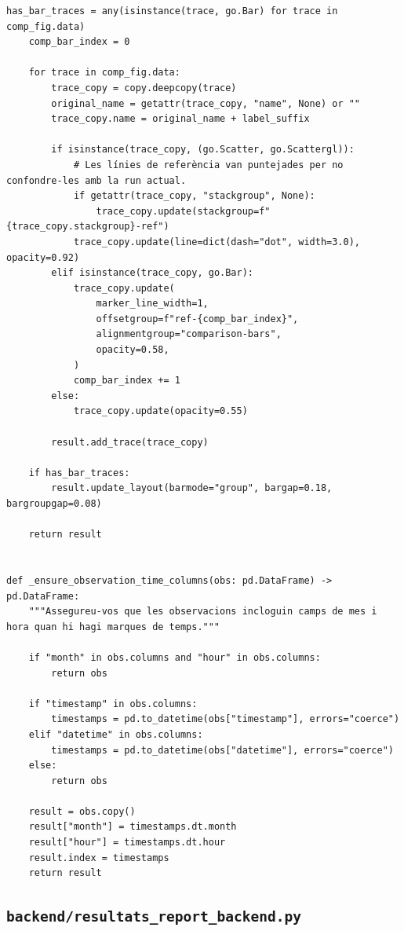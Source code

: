 \documentclass[10pt,a4paper]{article}
\begin{document}
\begin{lstlisting}[style=studioPython,caption={backend/resultats\_backend.py},label={lst:backend-resultats-backend-py}]
    has_bar_traces = any(isinstance(trace, go.Bar) for trace in comp_fig.data)
    comp_bar_index = 0

    for trace in comp_fig.data:
        trace_copy = copy.deepcopy(trace)
        original_name = getattr(trace_copy, "name", None) or ""
        trace_copy.name = original_name + label_suffix

        if isinstance(trace_copy, (go.Scatter, go.Scattergl)):
            # Les línies de referència van puntejades per no confondre-les amb la run actual.
            if getattr(trace_copy, "stackgroup", None):
                trace_copy.update(stackgroup=f"{trace_copy.stackgroup}-ref")
            trace_copy.update(line=dict(dash="dot", width=3.0), opacity=0.92)
        elif isinstance(trace_copy, go.Bar):
            trace_copy.update(
                marker_line_width=1,
                offsetgroup=f"ref-{comp_bar_index}",
                alignmentgroup="comparison-bars",
                opacity=0.58,
            )
            comp_bar_index += 1
        else:
            trace_copy.update(opacity=0.55)

        result.add_trace(trace_copy)

    if has_bar_traces:
        result.update_layout(barmode="group", bargap=0.18, bargroupgap=0.08)

    return result


def _ensure_observation_time_columns(obs: pd.DataFrame) -> pd.DataFrame:
    """Assegureu-vos que les observacions incloguin camps de mes i hora quan hi hagi marques de temps."""

    if "month" in obs.columns and "hour" in obs.columns:
        return obs

    if "timestamp" in obs.columns:
        timestamps = pd.to_datetime(obs["timestamp"], errors="coerce")
    elif "datetime" in obs.columns:
        timestamps = pd.to_datetime(obs["datetime"], errors="coerce")
    else:
        return obs

    result = obs.copy()
    result["month"] = timestamps.dt.month
    result["hour"] = timestamps.dt.hour
    result.index = timestamps
    return result
\end{lstlisting}


\subsection{\texorpdfstring{\texttt{backend/resultats\_report\_backend.py}}{backend/resultats\_report\_backend.py}}
\end{document}
